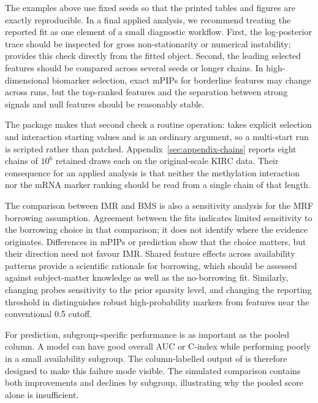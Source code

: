 \documentclass[article]{jss}
\begin{document}
The examples above use fixed seeds so that the printed tables and figures are
exactly reproducible.  In a final applied analysis, we recommend treating the
reported fit as one element of a small diagnostic workflow.  First, the
log-posterior trace should be inspected for gross non-stationarity or numerical
instability;  provides this check directly from
the fitted object.  Second, the leading selected features should be compared
across several seeds or longer chains.  In high-dimensional biomarker
selection, exact mPIPs for borderline features may change across runs, but the
top-ranked features and the separation between strong signals and null features
should be reasonably stable.

The package makes that second check a routine operation:  takes
explicit selection and interaction starting values and  is an
ordinary argument, so a multi-start run is scripted rather than patched.
Appendix~\ref{sec:appendix-chains} reports eight chains of $10^{6}$ retained
draws each on the original-scale KIRC data. Their consequence for an applied
analysis is that neither the methylation interaction nor the mRNA marker
ranking should be read from a single chain of that length.

The comparison between IMR and BMS is also a sensitivity analysis for the MRF
borrowing assumption.  Agreement between the fits indicates limited sensitivity to the borrowing
choice in that comparison; it does not identify where the evidence originates.
Differences in mPIPs or prediction show that the choice matters, but their
direction need not favour IMR. Shared feature effects across availability
patterns provide a scientific rationale for borrowing, which should be assessed
against subject-matter knowledge as well as the no-borrowing fit.  Similarly, changing  probes sensitivity to
the prior sparsity level, and changing the reporting threshold in
 distinguishes robust high-probability
markers from features near the conventional 0.5 cutoff.

For prediction, subgroup-specific performance is as important as the pooled
column.  A model can have good overall AUC or C-index while performing poorly in
a small availability subgroup.  The column-labelled output of 
is therefore designed to make this failure mode visible.  The simulated comparison contains both improvements and declines by subgroup,
illustrating why the pooled score alone is insufficient.
\end{document}
